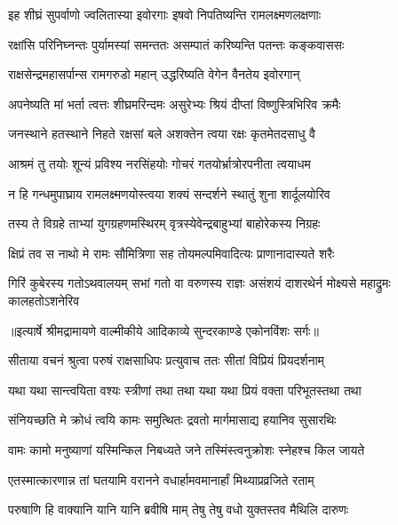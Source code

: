 \twolineshloka
{इह शीघ्रं सुपर्वाणो ज्वलितास्या इवोरगाः}
{इषवो निपतिष्यन्ति रामलक्ष्मणलक्षणाः} %

\twolineshloka
{रक्षांसि परिनिघ्नन्तः पुर्यामस्यां समन्ततः}
{असम्पातं करिष्यन्ति पतन्तः कङ्कवाससः} %

\twolineshloka
{राक्षसेन्द्रमहासर्पान्स रामगरुडो महान्}
{उद्धरिष्यति वेगेन वैनतेय इवोरगान्} %

\twolineshloka
{अपनेष्यति मां भर्ता त्वत्तः शीघ्रमरिन्दमः}
{असुरेभ्यः श्रियं दीप्तां विष्णुस्त्रिभिरिव क्रमैः} %

\twolineshloka
{जनस्थाने हतस्थाने निहते रक्षसां बले}
{अशक्तेन त्वया रक्षः कृतमेतदसाधु वै} %

\twolineshloka
{आश्रमं तु तयोः शून्यं प्रविश्य नरसिंहयोः}
{गोचरं गतयोर्भ्रात्रोरपनीता त्वयाधम} %

\twolineshloka
{न हि गन्धमुपाघ्राय रामलक्ष्मणयोस्त्वया}
{शक्यं सन्दर्शने स्थातुं शुना शार्दूलयोरिव} %

\twolineshloka
{तस्य ते विग्रहे ताभ्यां युगग्रहणमस्थिरम्}
{वृत्रस्येवेन्द्रबाहुभ्यां बाहोरेकस्य निग्रहः} %

\twolineshloka
{क्षिप्रं तव स नाथो मे रामः सौमित्रिणा सह}
{तोयमल्पमिवादित्यः प्राणानादास्यते शरैः} %

\fourlineindentedshloka
{गिरिं कुबेरस्य गतोऽथवालयम्}
{सभां गतो वा वरुणस्य राज्ञः}
{असंशयं दाशरथेर्न मोक्ष्यसे}
{महाद्रुमः कालहतोऽशनेरिव} %


{॥इत्यार्षे श्रीमद्रामायणे वाल्मीकीये आदिकाव्ये सुन्दरकाण्डे एकोनविंशः सर्गः॥}


\twolineshloka
{सीताया वचनं श्रुत्वा परुषं राक्षसाधिपः}
{प्रत्युवाच ततः सीतां विप्रियं प्रियदर्शनाम्} %

\twolineshloka
{यथा यथा सान्त्वयिता वश्यः स्त्रीणां तथा तथा}
{यथा यथा प्रियं वक्ता परिभूतस्तथा तथा} %

\twolineshloka
{संनियच्छति मे क्रोधं त्वयि कामः समुत्थितः}
{द्रवतो मार्गमासाद्य हयानिव सुसारथिः} %

\twolineshloka
{वामः कामो मनुष्याणां यस्मिन्किल निबध्यते}
{जने तस्मिंस्त्वनुक्रोशः स्नेहश्च किल जायते} %

\twolineshloka
{एतस्मात्कारणान्न तां घतयामि वरानने}
{वधार्हामवमानार्हां मिथ्याप्रव्रजिते रताम्} %

\twolineshloka
{परुषाणि हि वाक्यानि यानि यानि ब्रवीषि माम्}
{तेषु तेषु वधो युक्तस्तव मैथिलि दारुणः} %

